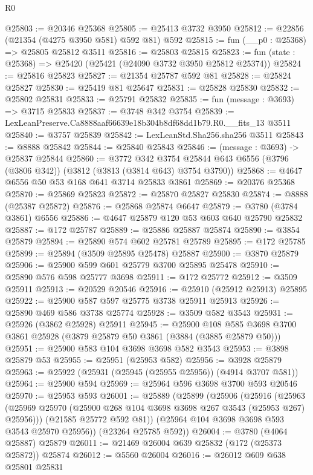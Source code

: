 \begin{lexlean}{R0}
\begin{coremodule}
@25803 := @20346 @25368
@25805 := @25413 @3732 @3950
@25812 := @22856 (@21354 (@4275 @3950 @581) @592 @81) @592
@25815 := fun (__p0 : @25368) => @25805 @25812 @3511
@25816 := @25803 @25815
@25823 := fun (state : @25368) => @25420 (@25421 (@24090 @3732 @3950 @25812 @25374))
@25824 := @25816 @25823
@25827 := @21354 @25787 @592 @81
@25828 := @25824 @25827
@25830 := @25419 @81 @25647
@25831 := @25828 @25830
@25832 := @25802 @25831
@25833 := @25791 @25832
@25835 := fun (message : @3693) => @3715 @25833
@25837 := @3748 @342 @3754
@25839 := LexLeanPreserve.Ca8888aaf66639e18b304b8df68dd1b79.R0.__fits_13 @3511
@25840 := @3757 @25839
@25842 := LexLeanStd.Sha256.sha256 @3511
@25843 := @8888 @25842
@25844 := @25840 @25843
@25846 := (message : @3693) -> @25837 @25844
@25860 := @3772
    @342
    @3754
    @25844
    @643
    @6556
    (@3796 (@3806 @342))
    (@3812 (@3813 (@3814 @643) @3754 @3790))
@25868 := @4647 @6556 @50 @53 @168 @641 @3714 @25833 @3861
@25869 := @20376 @25368
@25870 := @25869 @25823
@25872 := @25870 @25827 @25830
@25874 := @8888 (@25387 @25872)
@25876 := @25868 @25874 @6647
@25879 := @3780 (@3784 @3861) @6556
@25886 := @4647 @25879 @120 @53 @603 @640 @25790 @25832
@25887 := @172 @25787
@25889 := @25886 @25887 @25874
@25890 := @3854 @25879
@25894 := @25890 @574 @602 @25781 @25789
@25895 := @172 @25785
@25899 := @25894 (@3509 @25895 @25478) @25887
@25900 := @3870 @25879
@25906 := @25900 @599 @601 @25779 @3700 @25895 @25478
@25910 := @25890 @576 @598 @25777 @3698
@25911 := @172 @25772
@25912 := @3509 @25911
@25913 := @20529 @20546
@25916 := @25910 (@25912 @25913) @25895
@25922 := @25900 @587 @597 @25775 @3738 @25911 @25913
@25926 := @25890 @469 @586 @3738 @25774
@25928 := @3509 @582 @3543
@25931 := @25926 (@3862 @25928) @25911
@25945 := @25900
    @108
    @585
    @3698
    @3700
    @3861
    @25928
    (@3879 @25879 @50 @3861 (@3884 (@3885 @25879 @50)))
@25951 := @25900 @583 @104 @3698 @3698 @582 @3543
@25953 := @3898 @25879 @53
@25955 := @25951 (@25953 @582)
@25956 := @3928 @25879
@25963 := @25922 (@25931 (@25945 (@25955 @25956)) (@4914 @3707 @581))
@25964 := @25900 @594
@25969 := @25964 @596 @3698 @3700 @593 @20546
@25970 := @25953 @593
@26001 := @25889
    (@25899
      (@25906
        (@25916
          (@25963 (@25969 @25970 (@25900 @268 @104 @3698 @3698 @267 @3543 (@25953 @267) @25956)))
          (@21585 @25772 @592 @81))
        (@25964 @104 @3698 @3698 @593 @3543 @25970 @25956))
      (@23264 @25785 @592))
@26004 := @3780 (@4064 @25887) @25879
@26011 := @21469 @26004 @639 @25832 (@172 (@25373 @25872)) @25874
@26012 := @5560 @26004
@26016 := @26012 @609 @638 @25801 @25831

\end{coremodule}
\end{lexlean}
